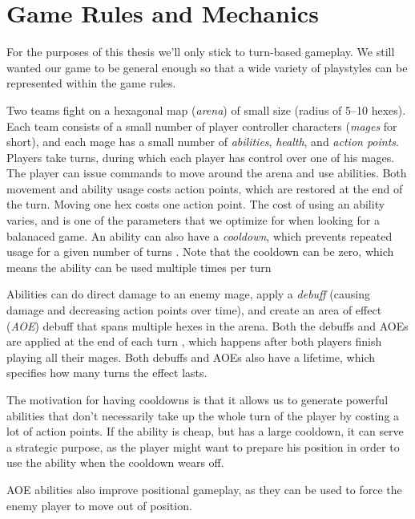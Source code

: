 \chapter{Game Rules and Mechanics}

For the purposes of this thesis we'll only stick to turn-based gameplay. We
still wanted our game to be general enough so that a wide variety of
playstyles can be represented within the game rules.

Two teams fight on a hexagonal map (\emph{arena}) of small size (radius of
5--10 hexes). Each team consists of a small number of player controller
characters (\emph{mages} for short), and each mage has a small number of
\emph{abilities}, \emph{health}, and \emph{action points}. Players take turns, during
which each player has control over one of his mages. The player can issue
commands to move around the arena and use abilities. Both movement and ability
usage costs action points, which are restored at the end of the turn.  Moving
one hex costs one action point. The cost of using an ability varies, and is one
of the parameters that we optimize for when looking for a balanaced game. An
ability can also have a \emph{cooldown}, which prevents repeated usage for a
given number of turns . Note that the cooldown can
be zero, which means the ability can be used multiple times per turn

Abilities can do direct damage to an enemy mage, apply a \emph{debuff} (causing
damage and decreasing action points over time), and create an area of effect
(\emph{AOE}) debuff that spans multiple hexes in the arena. Both the debuffs and
AOEs are applied at the end of each turn , which happens after both players finish playing all their mages.
Both debuffs and AOEs also have a lifetime, which specifies how many turns
 the effect lasts.

The motivation for having cooldowns is that it allows us to generate powerful
abilities that don't necessarily take up the whole turn of the player by costing
a lot of action points. If the ability is cheap, but has a large cooldown, it can
serve a strategic purpose, as the player might want to prepare his position in order
to use the ability when the cooldown wears off.

AOE abilities also improve positional gameplay, as they can be used to force the enemy
player to move out of position.



